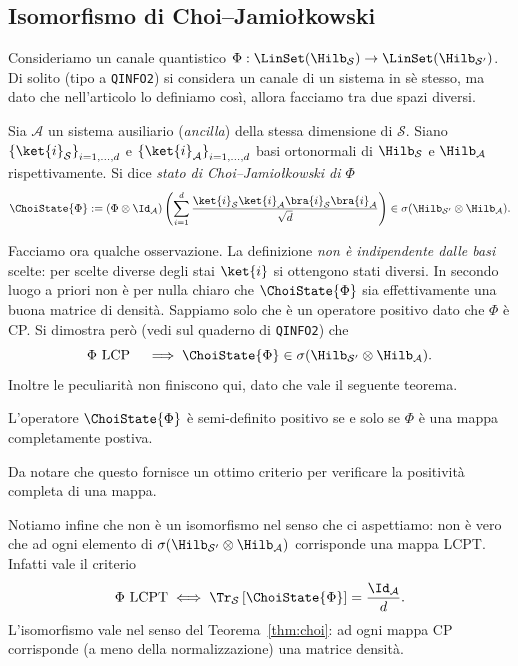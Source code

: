 \documentclass[a4]{article}
\begin{document}
\subsection{Isomorfismo di Choi–Jamiołkowski}
Consideriamo un canale quantistico \(\Phi: \LinSet(\Hilb_\mathcal{S}) \to
\LinSet(\Hilb_\mathcal{S'})\). Di solito (tipo a \texttt{QINFO2}) si considera un canale di
un sistema in sè stesso, ma dato che nell'articolo lo definiamo così, allora facciamo tra
due spazi diversi.
\begin{defn}
Sia \(\mathcal{A}\) un sistema ausiliario (\emph{ancilla}) della stessa dimensione di
\(\mathcal{S}\). Siano \( \left\{\ket{i}_\mathcal{S}\right\}_{i=1,\dots,d} \)  e
\(\left\{\ket{i}_\mathcal{A}\right\}_{i=1,\dots,d}\) basi ortonormali di \(\Hilb_\mathcal{S}\) e
\(\Hilb_\mathcal{A}\) rispettivamente. Si dice \emph{stato di Choi–Jamiołkowski di \(\Phi\)}
\[\ChoiState{\Phi} := \left( \Phi \otimes \Id_\mathcal{A}\right) 
  \left(\sum_{i=1}^d \frac{\ket{i}_\mathcal{S} \ket{i}_\mathcal{A} \bra{i}_\mathcal{S}
  \bra{i}_\mathcal{A}}{\sqrt{d}}\right) \in \sigma(\Hilb_\mathcal{S'} \otimes \Hilb_\mathcal{A}).\]
\end{defn}
Facciamo ora qualche osservazione. La definizione \emph{non è indipendente dalle basi} scelte:
per scelte diverse degli stai \(\ket{i}\) si ottengono stati diversi. In secondo luogo a priori
non è per nulla chiaro che \(\ChoiState{\Phi}\) sia effettivamente una buona matrice 
di densità. Sappiamo solo che è un operatore positivo dato che \(\Phi\) è CP. Si dimostra però
(vedi sul quaderno di \texttt{QINFO2}) che
\[\Phi\text{ LCP} \quad \implies \ChoiState{\Phi} \in \sigma(\Hilb_\mathcal{S'}
\otimes \Hilb_\mathcal{A}).\]
Inoltre le peculiarità non finiscono qui, dato che vale il seguente teorema.
\begin{thm} \label{thm:choi}
L'operatore \(\ChoiState{\Phi}\) è semi-definito positivo se e solo se \(\Phi\) è una mappa
completamente postiva.
\end{thm}
Da notare che questo fornisce un ottimo criterio per verificare la positività completa di
una mappa.

Notiamo infine che non è un isomorfismo nel senso che ci aspettiamo: non è vero che ad ogni
elemento di \(\sigma(\Hilb_\mathcal{S'}\otimes \Hilb_\mathcal{A})\) corrisponde una mappa
LCPT. Infatti vale il criterio
\[\Phi\text{ LCPT} \iff \Tr_\mathcal{S}\left[\ChoiState{\Phi}\right]=\frac{\Id_{\mathcal{A}}}{d}.\]
L'isomorfismo vale nel senso del Teorema~\ref{thm:choi}: ad ogni mappa CP corrisponde
(a meno della normalizzazione) una matrice densità.
\end{document}
